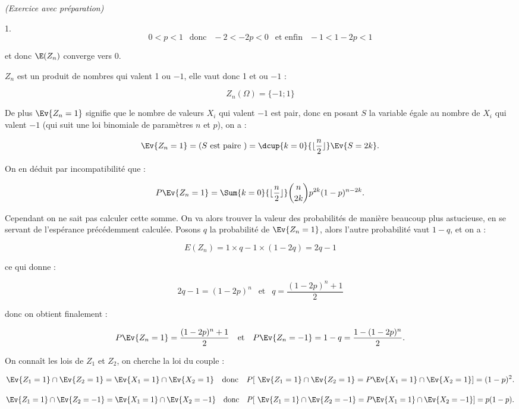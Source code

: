 \documentclass[11pt]{article}%
\begin{document}
\begin{exercice}{\it (Exercice avec préparation)}
\begin{noliste}{1.}
\[
 0 < p < 1 \ \ \text{ donc } \ \ -2 < -2p < 0 \ \ \text{ et enfin } \ \
-1 < 1 - 2p < 1 
\]

 et donc $\E( Z_{n})$ converge vers 0. \\

 \item $Z_{n}$ est un produit de nombres qui valent 1 ou $-1$, elle
vaut donc 1 et ou $-1$ : 
 
\[
 Z_{n} ( \Omega ) = \{ -1 ; 1 \} 
\]

 De plus $\Ev{Z_{n} = 1}$ signifie que le nombre de valeurs $X_{i}$ qui
valent $-1$ est pair, donc en posant $S$ la variable égale au nombre de
$X_{i}$ qui valent $-1$ (qui suit une loi binomiale de paramètres $n$
et $p$), on a : 
 
\[
 \Ev{Z_{n} = 1 } = ( S \text{ est paire } ) = \dcup{ k = 0 }{ \lfloor
\frac{n}{2} \rfloor } \Ev{ S = 2 k }. 
\]

 On en déduit par incompatibilité que : 
 
\[
 P \Ev{ Z_{n} = 1 } = \Sum{k = 0}{ \lfloor \frac{ n }{ 2 } \rfloor }
\binom{n}{2k} p^{2k} (1-p)^{n-2k}. 
\]

 Cependant on ne sait pas calculer cette somme. On va alors trouver la
valeur des probabilités de manière beaucoup plus astucieuse, en se
servant de l'espérance précédemment calculée. Posons $q$ la probabilité
de $\Ev{Z_{n} = 1}$, alors l'autre probabilité vaut $1-q$, et on a :
 
\[
 E ( Z_{n} ) = 1 \times q - 1 \times (1-2q) = 2 q -1 
\]

 ce qui donne : 
 
\[
 2 q - 1 = ( 1 - 2 p)^{n} \ \ \text{ et } \ \ q = \frac{ (1-2p)^{n} + 1
}{ 2 } 
\]

 donc on obtient finalement : 
 
\[
 P \Ev{ Z_{n} = 1 } = \frac{ (1-2p)^{n} + 1 }{ 2 } \ \ \text{ et } \ \
P \Ev{ Z_{n} = -1 } = 1 - q = \frac{ 1 - (1-2p)^{n} }{ 2 }. 
\]

 \item On connaît les lois de $Z_{1}$ et $Z_{2}$, on cherche la loi du
couple : 
 
\[
 \Ev{Z_{1} = 1 } \cap \Ev{Z_{2} = 1 } = \Ev{X_{1} = 1 } \cap \Ev{X_{2}
= 1 } \ \ \text{ donc } \ \ P [ \ \Ev{Z_{1} = 1 } \cap \Ev{Z_{2} = 1 }
= P \Ev{X_{1} = 1 } \cap \Ev{X_{2} = 1 } ] = (1-p)^{2}. 
\]

 
\[
 \Ev{Z_{1} = 1 } \cap \Ev{Z_{2} = -1 } = \Ev{X_{1} = 1 } \cap \Ev{X_{2}
= -1 } \ \ \text{ donc } \ \ P [ \ \Ev{Z_{1} = 1 } \cap \Ev{Z_{2} = -1
} = P \Ev{X_{1} = 1 } \cap \Ev{X_{2} = -1 } ] = p (1-p). 
\]


\end{noliste}
\end{exercice}
\end{document}
